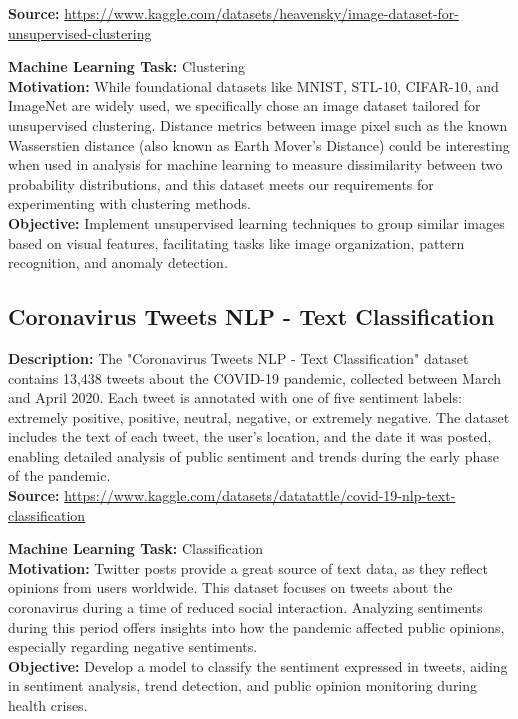 \documentclass{article}
\begin{document}
\textbf{Source:} \href{https://www.kaggle.com/datasets/heavensky/image-dataset-for-unsupervised-clustering}{https://www.kaggle.com/datasets/heavensky/image-dataset-for-unsupervised-clustering}


\textbf{Machine Learning Task:} Clustering \\

\textbf{Motivation:} While foundational datasets like MNIST, STL-10, CIFAR-10, and ImageNet are widely used, we specifically chose an image dataset tailored for unsupervised clustering. Distance metrics between image pixel such as the known Wasserstien distance (also known as Earth Mover’s Distance) could be interesting when used in analysis for machine learning to measure dissimilarity between two probability distributions, and this dataset meets our requirements for experimenting with clustering methods. \\

\textbf{Objective:} Implement unsupervised learning techniques to group similar images based on visual features, facilitating tasks like image organization, pattern recognition, and anomaly detection.

\subsection{Coronavirus Tweets NLP - Text Classification}
\textbf{Description:} The "Coronavirus Tweets NLP - Text Classification" dataset contains 13,438 tweets about the COVID-19 pandemic, collected between March and April 2020. Each tweet is annotated with one of five sentiment labels: extremely positive, positive, neutral, negative, or extremely negative. The dataset includes the text of each tweet, the user's location, and the date it was posted, enabling detailed analysis of public sentiment and trends during the early phase of the pandemic. \\

\textbf{Source:}
\href{https://www.kaggle.com/datasets/datatattle/covid-19-nlp-text-classification}{https://www.kaggle.com/datasets/datatattle/covid-19-nlp-text-classification}


\textbf{Machine Learning Task:} Classification \\

\textbf{Motivation:} Twitter posts provide a great source of text data, as they reflect opinions from users worldwide. This dataset focuses on tweets about the coronavirus during a time of reduced social interaction. Analyzing sentiments during this period offers insights into how the pandemic affected public opinions, especially regarding negative sentiments. \\


\textbf{Objective:} Develop a model to classify the sentiment expressed in tweets, aiding in sentiment analysis, trend detection, and public opinion monitoring during health crises.
\end{document}

